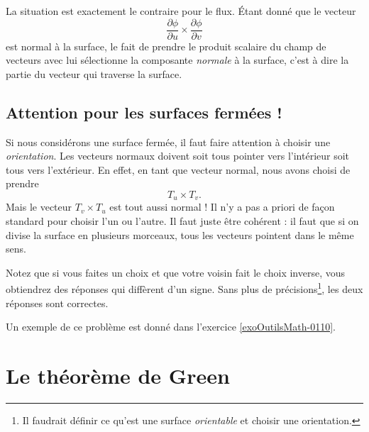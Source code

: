 La situation est exactement le contraire pour le flux. Étant donné que le vecteur
\begin{equation}
    \frac{ \partial \phi }{ \partial u }\times\frac{ \partial \phi }{ \partial v }
\end{equation}
est normal à la surface, le fait de prendre le produit scalaire du champ de vecteurs avec lui sélectionne la composante \emph{normale} à la surface, c'est à dire la partie du vecteur qui traverse la surface.

\subsection{Attention pour les surfaces fermées !}

Si nous considérons une surface fermée, il faut faire attention à choisir une \emph{orientation}. Les vecteurs normaux doivent soit tous pointer vers l'intérieur soit tous vers l'extérieur. En effet, en tant que vecteur normal, nous avons choisi de prendre
\begin{equation}
    T_u\times T_v.
\end{equation}
Mais le vecteur $T_v\times T_u$ est tout aussi normal ! Il n'y a pas a priori de façon standard pour choisir l'un ou l'autre. Il faut juste être cohérent : il faut que si on divise la surface en plusieurs morceaux, tous les vecteurs pointent dans le même sens.

Notez que si vous faites un choix et que votre voisin fait le choix inverse, vous obtiendrez des réponses qui diffèrent d'un signe. Sans plus de précisions\footnote{Il faudrait définir ce qu'est une surface \emph{orientable} et choisir une orientation.}, les deux réponses sont correctes.

Un exemple de ce problème est donné dans l'exercice \ref{exoOutilsMath-0110}.
\section{Le théorème de Green}

